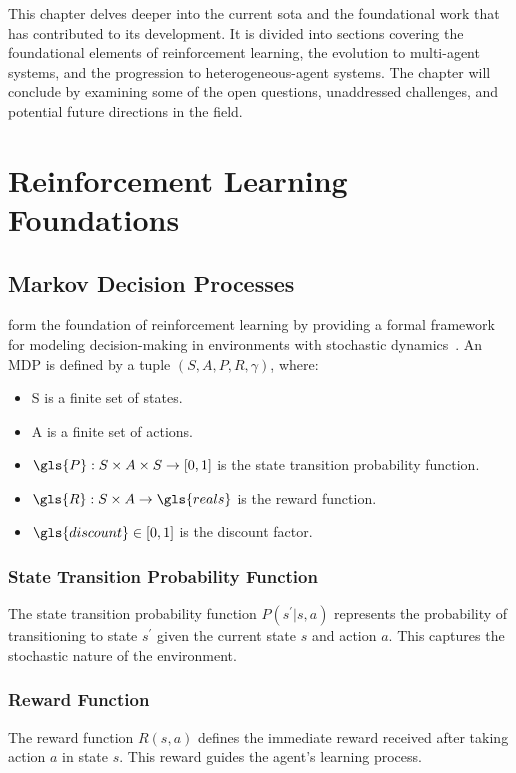 \glsresetall

This chapter delves deeper into the current \gls{sota} and the foundational work that has 
contributed to its development. It is divided into sections covering the foundational elements 
of reinforcement learning, the evolution to multi-agent systems, and the progression to 
heterogeneous-agent systems. The chapter will conclude by examining some of the open questions, 
unaddressed challenges, and potential future directions in the field.

\section{Reinforcement Learning Foundations}

\subsection*{Markov Decision Processes}

 form the foundation of reinforcement learning by providing a formal framework for 
modeling decision-making in environments with stochastic dynamics~\cite{puterman2005}.
An MDP is defined by a tuple \((S, A, P, R, \gamma)\), where:
\begin{itemize}
    \item \gls{S} is a finite set of states.
    \item \gls{A} is a finite set of actions.
    \item \(\gls{P}: S\times A\times S\rightarrow [0,1]\) is the state transition 
    probability function.
    \item \(\gls{R}: S \times A \rightarrow \gls{reals}\) is the reward function.
    \item \(\gls{discount} \in [0, 1]\) is the discount factor.
\end{itemize}

\subsubsection*{State Transition Probability Function}
The state transition probability function \(P(s^\prime|s, a)\) represents the probability of 
transitioning to state \(s^\prime\) given the current state \(s\) and action \(a\). 
This captures the stochastic nature of the environment.

\subsubsection*{Reward Function}
The reward function \(R(s, a)\) defines the immediate reward received after taking 
action \(a\) in state \(s\). This reward guides the agent's learning process.

